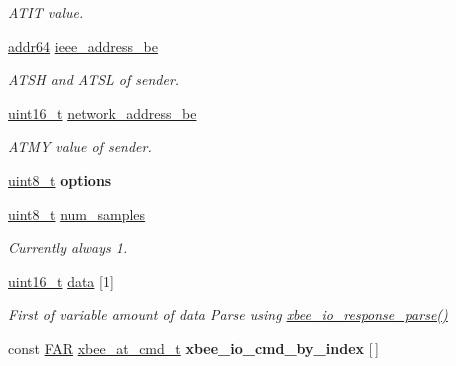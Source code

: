 \begin{DoxyCompactItemize}
\begin{DoxyCompactList}\small\item\em A\-T\-I\-T value. \end{DoxyCompactList}\item 
\hypertarget{group__xbee__io_ga231e348f98931de7fde1d09f64264afc}{\hyperlink{unionaddr64}{addr64} \hyperlink{group__xbee__io_ga231e348f98931de7fde1d09f64264afc}{ieee\-\_\-address\-\_\-be}}\label{group__xbee__io_ga231e348f98931de7fde1d09f64264afc}

\begin{DoxyCompactList}\small\item\em A\-T\-S\-H and A\-T\-S\-L of sender. \end{DoxyCompactList}\item 
\hypertarget{group__xbee__io_ga73d48563eb05cd5fcc4add79d226a3b8}{\hyperlink{group__hal_ga5a8b2dc9e45a9ee81a94ef304fb62505}{uint16\-\_\-t} \hyperlink{group__xbee__io_ga73d48563eb05cd5fcc4add79d226a3b8}{network\-\_\-address\-\_\-be}}\label{group__xbee__io_ga73d48563eb05cd5fcc4add79d226a3b8}

\begin{DoxyCompactList}\small\item\em A\-T\-M\-Y value of sender. \end{DoxyCompactList}\item 
\hypertarget{group__xbee__io_gaace3d640c8d449b8db1162993d259d3f}{\hyperlink{group__hal_gae1affc9ca37cfb624959c866a73f83c2}{uint8\-\_\-t} {\bfseries options}}\label{group__xbee__io_gaace3d640c8d449b8db1162993d259d3f}

\item 
\hypertarget{group__xbee__io_ga6bd874a22b34b2e3f911f90b07c4e6b4}{\hyperlink{group__hal_gae1affc9ca37cfb624959c866a73f83c2}{uint8\-\_\-t} \hyperlink{group__xbee__io_ga6bd874a22b34b2e3f911f90b07c4e6b4}{num\-\_\-samples}}\label{group__xbee__io_ga6bd874a22b34b2e3f911f90b07c4e6b4}

\begin{DoxyCompactList}\small\item\em Currently always 1. \end{DoxyCompactList}\item 
\hypertarget{group__xbee__io_gac5955aa1e44ff234e6d78a19cf68f25c}{\hyperlink{group__hal_ga5a8b2dc9e45a9ee81a94ef304fb62505}{uint16\-\_\-t} \hyperlink{group__xbee__io_gac5955aa1e44ff234e6d78a19cf68f25c}{data} \mbox{[}1\mbox{]}}\label{group__xbee__io_gac5955aa1e44ff234e6d78a19cf68f25c}

\begin{DoxyCompactList}\small\item\em First of variable amount of data Parse using \hyperlink{group__xbee__io_ga49aae35ec2a46306bf2ad593cecbcf26}{xbee\-\_\-io\-\_\-response\-\_\-parse()} \end{DoxyCompactList}\item 
\hypertarget{group__xbee__io_ga57790808110ca09ef2d7ec4a5573d4d2}{const \hyperlink{group__hal_gaef060b3456fdcc093a7210a762d5f2ed}{F\-A\-R} \hyperlink{unionxbee__at__cmd__t}{xbee\-\_\-at\-\_\-cmd\-\_\-t} {\bfseries xbee\-\_\-io\-\_\-cmd\-\_\-by\-\_\-index} \mbox{[}$\,$\mbox{]}}\label{group__xbee__io_ga57790808110ca09ef2d7ec4a5573d4d2}


\end{DoxyCompactItemize}
